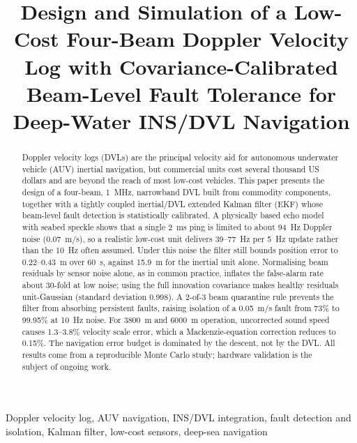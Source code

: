 \documentclass[conference]{IEEEtran}
\begin{document}
\title{Design and Simulation of a Low-Cost Four-Beam Doppler Velocity Log with Covariance-Calibrated Beam-Level Fault Tolerance for Deep-Water INS/DVL Navigation}

\author{
}

\maketitle

\begin{abstract}
Doppler velocity logs (DVLs) are the principal velocity aid for autonomous underwater vehicle (AUV) inertial navigation, but commercial units cost several thousand US dollars and are beyond the reach of most low-cost vehicles. This paper presents the design of a four-beam, 1~MHz, narrowband DVL built from commodity components, together with a tightly coupled inertial/DVL extended Kalman filter (EKF) whose beam-level fault detection is statistically calibrated. A physically based echo model with seabed speckle shows that a single 2~ms ping is limited to about 94~Hz Doppler noise (0.07~m/s), so a realistic low-cost unit delivers 39--77~Hz per 5~Hz update rather than the 10~Hz often assumed. Under this noise the filter still bounds position error to 0.22--0.43~m over 60~s, against 15.9~m for the inertial unit alone. Normalising beam residuals by sensor noise alone, as in common practice, inflates the false-alarm rate about 30-fold at low noise; using the full innovation covariance makes healthy residuals unit-Gaussian (standard deviation 0.998). A 2-of-3 beam quarantine rule prevents the filter from absorbing persistent faults, raising isolation of a 0.05~m/s fault from 73\% to 99.95\% at 10~Hz noise. For 3800~m and 6000~m operation, uncorrected sound speed causes 1.3--3.8\% velocity scale error, which a Mackenzie-equation correction reduces to 0.15\%. The navigation error budget is dominated by the descent, not by the DVL. All results come from a reproducible Monte Carlo study; hardware validation is the subject of ongoing work.
\end{abstract}

\begin{IEEEkeywords}
Doppler velocity log, AUV navigation, INS/DVL integration, fault detection and isolation, Kalman filter, low-cost sensors, deep-sea navigation
\end{IEEEkeywords}
\end{document}
